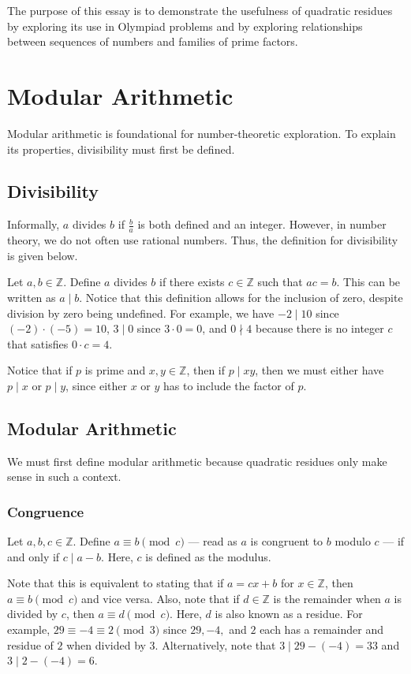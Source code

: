 \documentclass{article}
\newcommand{\Z}{\mathbb{Z}}
\begin{document}
The purpose of this essay is to demonstrate the usefulness of quadratic residues by exploring its use in Olympiad problems and by exploring relationships between sequences of numbers and families of prime factors.
\newpage
\section{Modular Arithmetic}
Modular arithmetic is foundational for number-theoretic exploration. To explain its properties, divisibility must first be defined.
\subsection{Divisibility}
Informally, $a$ divides $b$ if $\frac{b}{a}$ is both defined and an integer. However, in number theory, we do not often use rational numbers. Thus, the definition for divisibility is given below.

Let $a,b \in \Z$. Define $a$ divides $b$ if there exists $c\in \Z$ such that $ac = b$. This can be written as $a \mid b$. Notice that this definition allows for the inclusion of zero, despite division by zero being undefined. For example, we have $-2 \mid 10$ since $(-2) \cdot (-5) = 10$, $3 \mid 0$ since $3 \cdot 0 = 0$, and $0 \nmid 4$ because there is no integer $c$ that satisfies $0 \cdot c = 4$.

Notice that if $p$ is prime and $x,y \in \Z$, then if $p \mid xy$, then we must either have $p \mid x$ or $p \mid y$, since either $x$ or $y$ has to include the factor of $p$.
\subsection{Modular Arithmetic}
We must first define modular arithmetic because quadratic residues only make sense in such a context.
\subsubsection{Congruence}
Let $a,b,c \in \Z.$ Define $a \equiv b \pmod c$ --- read as $a$ is congruent to $b$ modulo $c$ --- if and only if $c \mid a-b$. Here, $c$ is defined as the modulus.

Note that this is equivalent to stating that if $a=cx+b$ for $x \in \Z$, then $a \equiv b \pmod c$ and vice versa. Also, note that if $d \in \Z$ is the remainder when $a$ is divided by $c$, then $a \equiv d \pmod c$. Here, $d$ is also known as a residue. For example, $29 \equiv -4 \equiv 2 \pmod 3$ since $29, -4,$ and $2$ each has a remainder and residue of $2$ when divided by 3. Alternatively, note that $3 \mid 29 - (-4) = 33$ and $3 \mid 2 - (-4) = 6$.
\end{document}
